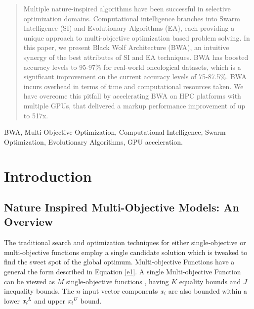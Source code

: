 \documentclass[conference]{IEEEtran}
\begin{document}
\begin{abstract}
Multiple nature-inspired algorithms have been successful in selective optimization domains. Computational intelligence branches into Swarm Intelligence (SI) and Evolutionary Algorithms (EA), each providing a unique approach to multi-objective optimization based problem solving. In this paper, we present Black Wolf Architecture (BWA), an intuitive synergy of the best attributes of SI and EA techniques. BWA has boosted accuracy levels to 95-97\% for real-world oncological datasets, which is a significant improvement on the current accuracy levels of 75-87.5\%. BWA incurs overhead in terms of time and computational resources taken. We have overcome this pitfall by accelerating BWA on HPC platforms with multiple GPUs,  that delivered a markup performance improvement of up to 517x.
\end{abstract}

\begin{IEEEkeywords}
BWA, Multi-Objective Optimization, Computational Intelligence, Swarm Optimization, Evolutionary Algorithms, GPU acceleration.
\end{IEEEkeywords}

\section{Introduction}

\subsection{Nature Inspired Multi-Objective Models: An Overview}

The traditional search and optimization techniques for either single-objective or multi-objective functions employ a single candidate solution which is tweaked to find the sweet spot of the global optimum. Multi-objective Functions have a general the form described in Equation \ref{e1}. A single Multi-objective Function can be viewed as $\textit{M}$ single-objective functions \cite{chankong}, having $\textit{K}$ equality bounds and $\textit{J}$ inequality bounds. The $\textit{n}$ input vector components $\textit{x\textsubscript{i}}$ are also bounded within a lower $\textit{x\textsubscript{i}\textsuperscript{L}}$ and upper $\textit{x\textsubscript{i}\textsuperscript{U}}$ bound. 
\end{document}
